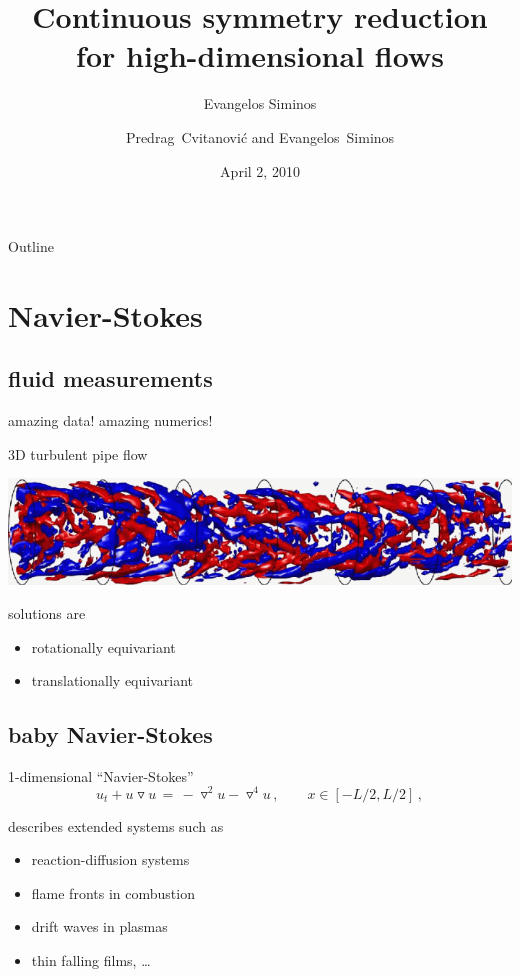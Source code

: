 \documentclass{beamer}
\title{Continuous symmetry reduction for high-dimensional flows}
\author{Evangelos Siminos}
\author[Siminos, Cvitanovi\'c, Davidchack]
{
  \textcolor{green!50!black}{
  {Predrag~Cvitanovi\'c}\inst{1}
  and
  {Evangelos~Siminos}\inst{1,2}
  }
}
\institute
{
  \inst{1}%
  Georgia Institute of Technology
  \and
  \vskip-2mm
  \inst{2}
  CEA/DAM/DIF, Paris
}
\date{April 2, 2010}
\begin{document}
\begin{frame}
  \titlepage
\end{frame}

\begin{frame}{Outline}
  \tableofcontents
\end{frame}


\section[Navier-Stokes]{Navier-Stokes}

\subsection[modern times]{fluid measurements}

\begin{frame}{amazing data! amazing numerics!}
\begin{block}{3D turbulent pipe flow}
\begin{center}
  \includegraphics[width=1.0\textwidth,clip=true]
                    {../../figs/vDoorne4}
\end{center}
\end{block}

\bigskip

solutions are
\begin{itemize}
 \item rotationally equivariant
 \item translationally equivariant
\end{itemize}

\end{frame}

\subsection[KSe]{baby Navier-Stokes}
\begin{frame}{\KSe}

\begin{block}{1-dimensional ``Navier-Stokes''}
\[
  u_t + u \triangledown u \,=\, -\triangledown^2 u- \triangledown^4 u
    \,,\qquad   x \in [-L/2,L/2]
    \,,
\]
\end{block}

\bigskip

describes extended systems such as
\begin{itemize}
 \item reaction-diffusion systems
 \item flame fronts in combustion
 \item drift waves in plasmas
 \item thin falling films, \ldots
\end{itemize}

\end{frame}
\end{document}
